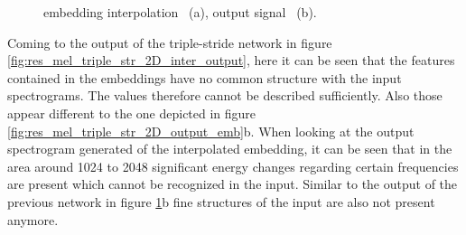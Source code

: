 \begin{figure}[htb!]
    \centering
    \caption{embedding interpolation ~(a), output signal ~(b).}
    \label{fig:res_mel_double_str_2D_inter_output}
\end{figure}

Coming to the output of the triple-stride network in figure \ref{fig:res_mel_triple_str_2D_inter_output}, here it can be seen that the features contained in the embeddings have no common structure with the input spectrograms. The values therefore cannot be described sufficiently. Also those appear different to the one depicted in figure \ref{fig:res_mel_triple_str_2D_output_emb}b. When looking at the output spectrogram generated of the interpolated embedding, it can be seen that in the area around 1024 to 2048 significant energy changes regarding certain frequencies are present which cannot be recognized in the input. Similar to the output of the previous network in figure \ref{fig:res_mel_double_str_2D_inter_output}b fine structures of the input are also not present anymore. 

